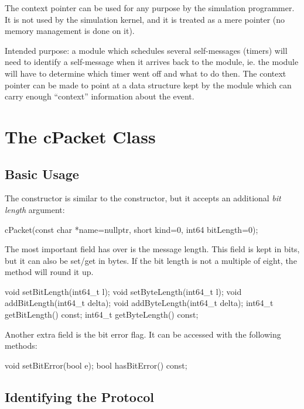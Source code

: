 The context pointer can be used for any purpose by the simulation programmer.
It is not used by the simulation kernel, and it is treated as
a mere pointer (no memory management is done on it).

Intended purpose: a module which schedules several self-messages (timers)
will need to identify a self-message when it arrives back to the module,
ie. the module will have to determine which timer went off and what to do
then. The context pointer can be made to point at a data structure kept by
the module which can carry enough ``context'' information about the event.



\section{The cPacket Class}
\label{sec:msgs:cpacket}

\subsection{Basic Usage}
\label{sec:messages:cpacket-basic-usage}

The  constructor is similar to the 
constructor, but it accepts an additional \textit{bit length} argument:

\begin{cpp}
cPacket(const char *name=nullptr, short kind=0, int64 bitLength=0);
\end{cpp}

The most important field  has over  is
the message length. This field is kept in bits, but it can also be
set/get in bytes. If the bit length is not a multiple of eight, the
 method will round it up.

\begin{cpp}
void setBitLength(int64_t l);
void setByteLength(int64_t l);
void addBitLength(int64_t delta);
void addByteLength(int64_t delta);
int64_t getBitLength() const;
int64_t getByteLength() const;
\end{cpp}

Another extra field is the bit error flag. It can be accessed with the
following methods:

\begin{cpp}
void setBitError(bool e);
bool hasBitError() const;
\end{cpp}


\subsection{Identifying the Protocol}
\label{sec:messages:identifying-protocol-of-packet}

